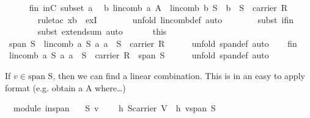 \begin{isabellebody}
\ \ \ \ \isamarkupfalse%
\ fin\ inC\ subset\ a\ \isamarkupfalse%
\ {\isachardoublequoteopen}{\isasymexists}b{\isachardot}\ lincomb\ a\ A\ {\isacharequal}\ lincomb\ b\ S\ {\isasymand}\ b\ {\isasymin}\ S\ {\isasymrightarrow}\ carrier\ R{\isachardoublequoteclose}\isanewline
\ \ \ \ \ \ \isamarkupfalse%
\ {\isacharparenleft}rule{\isacharunderscore}tac\ x{\isacharequal}{\isachardoublequoteopen}{\isacharquery}b{\isachardoublequoteclose}\ \ exI{\isacharparenright}\isanewline
\ \ \ \ \ \ \isamarkupfalse%
\ {\isacharparenleft}unfold\ lincomb{\isacharunderscore}def{\isacharcomma}\ auto{\isacharparenright}\isanewline
\ \ \ \ \ \ \isamarkupfalse%
\ {\isacharparenleft}subst\ if{\isacharunderscore}in{\isacharparenright}\isanewline
\ \ \ \ \ \ \isamarkupfalse%
\ {\isacharparenleft}subst\ extend{\isacharunderscore}sum{\isacharcomma}\ auto{\isacharparenright}\isanewline
\ \ \isacommand{{\isacharbraceright}}\isamarkupfalse%
\isanewline
\ \ \isamarkupfalse%
\ this\ \isamarkupfalse%
\ {\isachardoublequoteopen}span\ S\ {\isasymsubseteq}\ {\isacharbraceleft}lincomb\ a\ S\ {\isacharbar}a{\isachardot}\ a\ {\isasymin}\ S\ {\isasymrightarrow}\ carrier\ R{\isacharbraceright}{\isachardoublequoteclose}\isanewline
\ \ \ \ \isamarkupfalse%
\ {\isacharparenleft}unfold\ span{\isacharunderscore}def{\isacharcomma}\ auto{\isacharparenright}\isanewline
{}\isamarkupfalse%
\isanewline
\ \ \isamarkupfalse%
\ fin\ \isamarkupfalse%
\ {\isachardoublequoteopen}{\isacharbraceleft}lincomb\ a\ S\ {\isacharbar}a{\isachardot}\ a\ {\isasymin}\ S\ {\isasymrightarrow}\ carrier\ R{\isacharbraceright}\ {\isasymsubseteq}\ span\ S{\isachardoublequoteclose}\isanewline
\ \ \ \ \isamarkupfalse%
\ {\isacharparenleft}unfold\ span{\isacharunderscore}def{\isacharcomma}\ auto{\isacharparenright}\isanewline
{}\isamarkupfalse%
%
\endisatagproof
{\isafoldproof}%
%
\isadelimproof
%
\endisadelimproof
%
\begin{isamarkuptext}%
If $v\in \text{span S}$, then we can find a linear combination. This is in an easy to apply
format (e.g. obtain a A where\ldots)%
\end{isamarkuptext}%
\isamarkuptrue%
\isamarkupfalse%
\ {\isacharparenleft}\ module{\isacharparenright}\ in{\isacharunderscore}span{\isacharcolon}\isanewline
\ \ \ S\ v\isanewline
\ \ \ \ h{}{\isacharcolon}\ {\isachardoublequoteopen}S{\isasymsubseteq}carrier\ V{\isachardoublequoteclose}\ \ h{}{\isacharcolon}\ {\isachardoublequoteopen}v{\isasymin}span\ S{\isachardoublequoteclose}\isanewline

\end{isabellebody}
